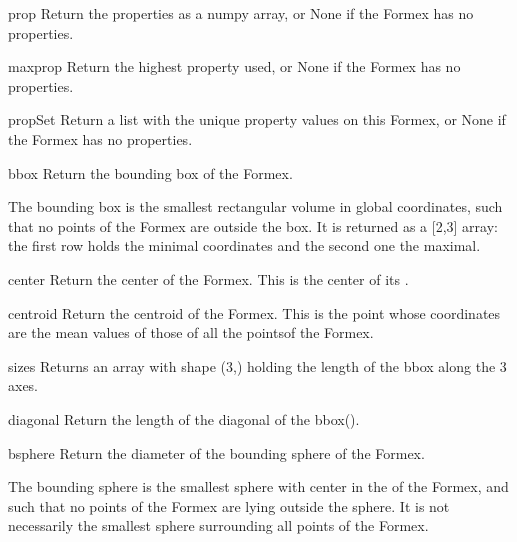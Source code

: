 \begin{methoddesc}{prop}{}
Return the properties as a numpy array, or None if the Formex has no properties.
\end{methoddesc}

\begin{methoddesc}{maxprop}{}
Return the highest property used, or None if the Formex has no properties.
\end{methoddesc}

\begin{methoddesc}{propSet}{}
Return a list with the unique property values on this Formex, or None if the Formex has no properties.
\end{methoddesc}


\begin{methoddesc}{bbox}{}
Return the bounding box of the Formex.

The bounding box is the smallest rectangular volume in global coordinates, such that no points of the Formex are outside the box. It is returned as a [2,3] array: the first row holds the minimal coordinates and the second one the maximal.
\end{methoddesc}

\begin{methoddesc}{center}{}
Return the center of the Formex. This is the center of its .
\end{methoddesc}

\begin{methoddesc}{centroid}{}
Return the centroid of the Formex. This is the point whose coordinates
 are the mean values of those of all the pointsof the Formex.
\end{methoddesc}

\begin{methoddesc}{sizes}{}
Returns an array with shape (3,) holding the length of the bbox along the 3 axes.
\end{methoddesc}

\begin{methoddesc}{diagonal}{}
Return the length of the diagonal of the bbox().
\end{methoddesc}

\begin{methoddesc}{bsphere}{}
Return the diameter of the bounding sphere of the Formex.

The bounding sphere is the smallest sphere with center in the  of the Formex, and such that no points of the Formex are lying outside the sphere. It is not necessarily the smallest sphere surrounding all points of the Formex.
\end{methoddesc}


